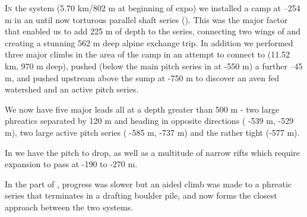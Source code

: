 \thispagestyle{endchapter}

\begin{tcolorbox}
\vspace{80pt}

\lettrine{I}{n} the  system (5.70 km/802 m at beginning of expo) we
installed a camp at --254 m in an until now torturous parallel shaft
series (). This was the major factor that enabled
us to add 225 m of depth to the  series,
connecting two wings of  and creating a stunning 562 m
deep alpine exchange trip. In addition we performed three major climbs
in the area of the camp in an attempt to connect  to
 (11.52 km, 970 m deep), pushed 
(below the main pitch series in  at -550 m) a further
--45 m, and pushed upstream above the  sump at -750 m to
discover an aven fed watershed and an active pitch series.

We now have
five major leads all at a depth greater than 500 m - two large phreatics separated by 120 m and heading in opposite
directions ( -539 m,  -529 m), two
large active pitch series ( -585 m, 
-737 m) and the rather tight  (-577 m).

In  we have the  pitch to drop, as well as a multitude of narrow rifts which
require expansion to pass at -190 to -270 m.

In the  part of , progress was slower but an
aided climb was made to a phreatic series that terminates in a drafting
boulder pile, and now forms the closest approach between the two
systems.

\end{tcolorbox}
\BgThispage

